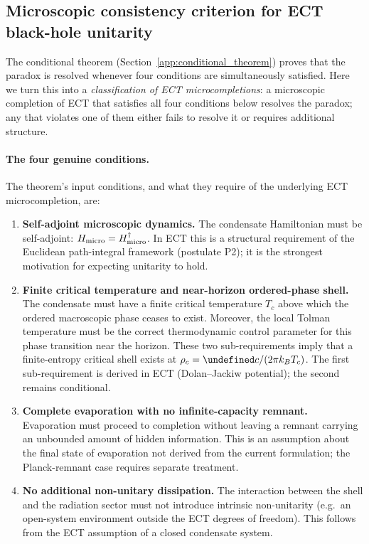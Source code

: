 \documentclass[11pt,a4paper]{article}
\let\hbar\undefined
\numberwithin{equation}{section}
\begin{document}
\subsection{Microscopic consistency criterion for ECT black-hole unitarity}
\label{app:consistency_criterion}

The conditional theorem (Section~\ref{app:conditional_theorem}) proves that
the paradox is resolved whenever four conditions are simultaneously satisfied.
Here we turn this into a \emph{classification of ECT microcompletions}: a
microscopic completion of ECT that satisfies all four conditions below resolves
the paradox; any that violates one of them either fails to resolve it or
requires additional structure.

\paragraph{The four genuine conditions.}

The theorem's input conditions, and what they require of the underlying
ECT microcompletion, are:

\begin{enumerate}[label=(C\arabic*)]

\item \textbf{Self-adjoint microscopic dynamics.}
The condensate Hamiltonian must be self-adjoint: $H_{\rm micro} = H_{\rm micro}^\dagger$.
In ECT this is a structural requirement of the Euclidean path-integral
framework (postulate P2); it is the strongest motivation for expecting
unitarity to hold.

\item \textbf{Finite critical temperature and near-horizon ordered-phase shell.}
The condensate must have a finite critical temperature $T_c$ above which
the ordered macroscopic phase ceases to exist.
Moreover, the local Tolman temperature must be the correct thermodynamic
control parameter for this phase transition near the horizon.
These two sub-requirements imply that a finite-entropy critical shell exists
at $\rho_c = \hbar c/(2\pi k_B T_c)$.
The first sub-requirement is derived in ECT (Dolan--Jackiw potential);
the second remains conditional.

\item \textbf{Complete evaporation with no infinite-capacity remnant.}
Evaporation must proceed to completion without leaving a remnant carrying
an unbounded amount of hidden information.
This is an assumption about the final state of evaporation not derived from
the current formulation; the Planck-remnant case requires separate treatment.

\item \textbf{No additional non-unitary dissipation.}
The interaction between the shell and the radiation sector must not
introduce intrinsic non-unitarity (e.g.\ an open-system environment outside
the ECT degrees of freedom).
This follows from the ECT assumption of a closed condensate system.

\end{enumerate}
\end{document}
